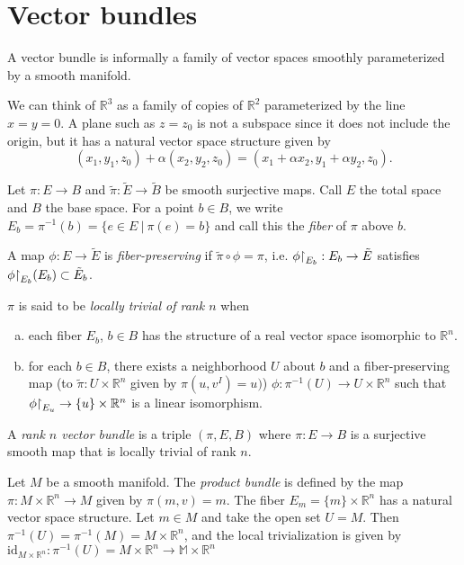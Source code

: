 \section{Vector bundles}

A vector bundle is informally a family of vector spaces smoothly
parameterized by a smooth manifold.

\begin{xmpl}
We can think of $\mathbb{R}^3$ as a family of copies of $\mathbb{R}^2$
parameterized by the line $x = y = 0$. A plane such as $z = z_0$ is not
a subspace since it does not include the origin, but it has a natural
vector space structure given by
$$
  (x_1, y_1, z_0) + \alpha(x_2, y_2, z_0)
= (x_1 + \alpha x_2, y_1 + \alpha y_2, z_0).
$$
\end{xmpl}

\begin{defn}
Let $\pi: E \to B$ and $\tilde{\pi}: \tilde{E} \to \tilde{B}$ be
smooth surjective maps. Call $E$ the total space and $B$ the base
space. For a point $b \in B$,
we write $E_b = \pi^{-1}(b) = \{e \in E ~\vert~ \pi(e) = b\}$ and call
this the \emph{fiber} of $\pi$ above $b$.

A map $\phi: E \to \tilde{E}$ is \emph{fiber-preserving} if
$\tilde{\pi} \circ \phi = \pi$, i.e.
$\phi\mathord{\upharpoonright}_{E_b} : E_b \to \tilde{E}$ satisfies
$\phi\mathord{\upharpoonright}_{E_b} (E_b) \subset \tilde{E}_b$.

$\pi$ is said to be \emph{locally trivial of rank $n$} when
\begin{enumerate}[(a)]
  \item{
    each fiber $E_b$, $b \in B$ has the structure of a real vector
    space isomorphic to $\mathbb{R}^n$.
  }
  \item{
    for each $b \in B$, there exists a neighborhood $U$ about $b$ and
    a fiber-preserving map
    (to $\tilde{\pi} : U \times \mathbb{R}^n$ given by $\pi(u, v^I) = u)$)
    $\phi : \pi^{-1}(U) \to U \times \mathbb{R}^n$ such that
    $\phi\mathord{\upharpoonright}_{E_u} \to \{ u \} \times \mathbb{R}^n$ is a linear
    isomorphism.
  }
\end{enumerate}
A \emph{rank $n$ vector bundle} is a triple $(\pi, E, B)$ where
$\pi: E \to B$ is a surjective smooth map that is locally trivial of
rank $n$.
\end{defn}

\begin{xmpl}
Let $M$ be a smooth manifold. The \emph{product bundle} is defined by
the map $\pi: M \times \mathbb{R}^n \to M$ given by $\pi(m, v) =
m$. The fiber $E_m = \{m\} \times \mathbb{R}^n$ has a natural vector
space structure. Let $m \in M$ and take the open set $U = M$. Then
$\pi^{-1}(U) = \pi^{-1}(M) = M \times \mathbb{R}^n$, and the local
trivialization is given by
$\mathrm{id}_{M \times \mathbb{R}^n}: \pi^{-1}(U) = M \times \mathbb{R}^n \to \mathbb{M} \times
\mathbb{R}^n$
\end{xmpl}

